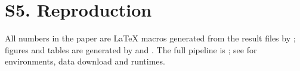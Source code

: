 \documentclass[onecolumn,10pt]{IEEEtran}
\begin{document}
\section*{S5. Reproduction}
All numbers in the paper are LaTeX macros generated from the result files by ; figures and tables are generated by  and . The full pipeline is ; see  for environments, data download and runtimes.
\end{document}
